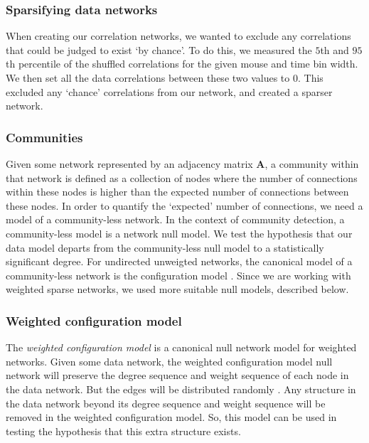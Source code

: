 \documentclass[a4paper,12pt]{article}
\theoremstyle{definition}
\begin{document}
        \subsubsection{Sparsifying data networks}\label{sec:sparsifying_data_networks}
        When creating our correlation networks, we wanted to exclude any correlations that could be judged to exist `by chance'. To do this, we measured the $5$th and $95$th percentile of the shuffled correlations for the given mouse and time bin width. We then set all the data correlations between these two values to $0$. This excluded any `chance' correlations from our network, and created a sparser network. 

        \subsubsection{Communities}
        Given some network represented by an adjacency matrix $\mathbf{A}$, a community within that network is defined as a collection of nodes where the number of connections within these nodes is higher than the expected number of connections between these nodes. In order to quantify the `expected' number of connections, we need a model of a community-less network. In the context of community detection, a community-less model is a network null model. We test the hypothesis that our data model departs from the community-less null model to a statistically significant degree. For undirected unweigted networks, the canonical model of a community-less network is the configuration model \cite{fosdick}. Since we are working with weighted sparse networks, we used more suitable null models, described below.

        \subsubsection{Weighted configuration model}\label{sec:weight_configuration_model}
        The \textit{weighted configuration model} is a canonical null network model for weighted networks. Given some data network, the weighted configuration model null network will preserve the degree sequence and weight sequence of each node in the data network. But the edges will be distributed randomly \cite{fosdick}. Any structure in the data network beyond its degree sequence and weight sequence will be removed in the weighted configuration model. So, this model can be used in testing the hypothesis that this extra structure exists. 
\end{document}
